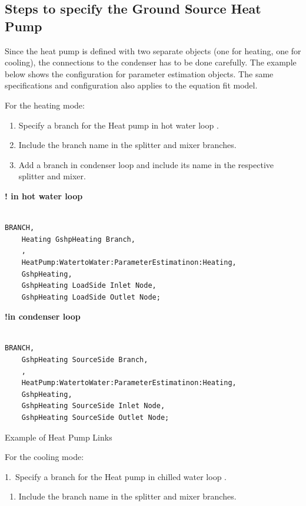 \subsection{Steps to specify the Ground Source Heat Pump}\label{steps-to-specify-the-ground-source-heat-pump}

Since the heat pump is defined with two separate objects (one for heating, one for cooling), the connections to the condenser has to be done carefully. The example below shows the configuration for parameter estimation objects. The same specifications and configuration also applies to the equation fit model.

For the heating mode:

\begin{enumerate}
\def\labelenumi{\arabic{enumi}.}
\item
  Specify a branch for the Heat pump in hot water loop .
\item
  Include the branch name in the splitter and mixer branches.
\item
  Add a branch in condenser loop and include its name in the respective splitter and mixer.
\end{enumerate}

\textbf{! in hot water loop}

\begin{lstlisting}

BRANCH,
	Heating GshpHeating Branch,
    ,
    HeatPump:WatertoWater:ParameterEstimatinon:Heating,
    GshpHeating,
    GshpHeating LoadSide Inlet Node,
    GshpHeating LoadSide Outlet Node;
\end{lstlisting}

\textbf{!in condenser loop}

\begin{lstlisting}

BRANCH,
	GshpHeating SourceSide Branch,
    ,
    HeatPump:WatertoWater:ParameterEstimatinon:Heating,
    GshpHeating,
    GshpHeating SourceSide Inlet Node,
    GshpHeating SourceSide Outlet Node;
\end{lstlisting}

Example of Heat Pump Links

For the cooling mode:

1.~Specify a branch for the Heat pump in chilled water loop .

\begin{enumerate}
\def\labelenumi{\arabic{enumi}.}
\setcounter{enumi}{1}
\tightlist
\item
  Include the branch name in the splitter and mixer branches.
\end{enumerate}

